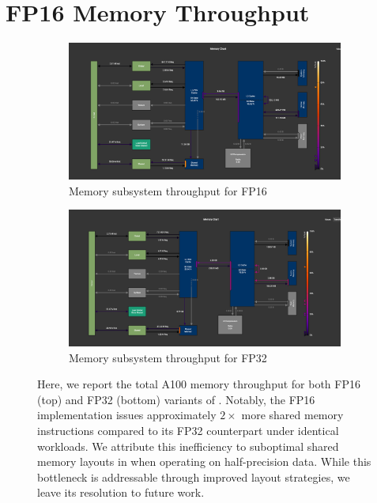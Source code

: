 \section{FP16 Memory Throughput}\label{sec:fp16-memory-throughput}
\begin{figure}[!ht]
    \centering
    \begin{subfigure}{\textwidth}
        \centering
        \includegraphics[width=0.8\linewidth, keepaspectratio]{figures/fp16_t}
        \caption{Memory subsystem throughput for FP16}
        \label{sub:fp16}
    \end{subfigure}
    \hfill
    \begin{subfigure}{\textwidth}
        \centering
        \includegraphics[width=0.8\linewidth, keepaspectratio]{figures/fp32_t}
        \caption{Memory subsystem throughput for FP32}
        \label{sub:fp32}
    \end{subfigure}
    \caption{Here, we report the total A100 memory throughput for both FP16 (top) and FP32 (bottom) variants of \sysname.
    Notably, the FP16 implementation issues approximately $2\times$
        more shared memory instructions compared to its FP32 counterpart
        under identical workloads.
        We attribute this inefficiency to
        suboptimal shared memory layouts in \sysname when
        operating on half-precision data.
        While this bottleneck is addressable through improved layout strategies,
        we leave its resolution to future work.}
    \label{fig:mem_t}
\end{figure}